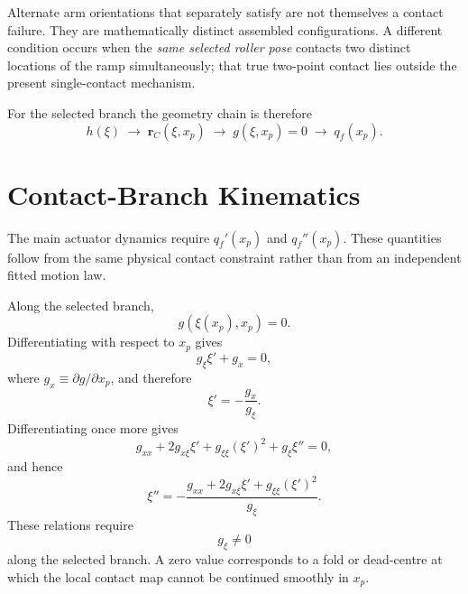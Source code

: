 \documentclass[11pt]{report}
\numberwithin{equation}{section}
\begin{document}
Alternate arm orientations that separately satisfy
 are not themselves a contact failure. They are
mathematically distinct assembled configurations. A different condition occurs
when the \emph{same selected roller pose} contacts two distinct locations of
the ramp simultaneously; that true two-point contact lies outside the present
single-contact mechanism.

For the selected branch the geometry chain is therefore
\begin{equation}
    \boxed{
    h(\xi)
    \;\longrightarrow\;
    \bm r_C(\xi,x_p)
    \;\longrightarrow\;
    g(\xi,x_p)=0
    \;\longrightarrow\;
    q_f(x_p).
    }
    \label{eq:appB_geometry_chain}
\end{equation}

\section{Contact-Branch Kinematics}
\label{app:flyweight_q_derivatives}

The main actuator dynamics require \(q_f'(x_p)\) and \(q_f''(x_p)\). These
quantities follow from the same physical contact constraint rather than from an
independent fitted motion law.

Along the selected branch,
\begin{equation}
    g(\xi(x_p),x_p)=0.
\end{equation}
Differentiating with respect to \(x_p\) gives
\begin{equation}
    g_\xi\xi'+g_x=0,
\end{equation}
where \(g_x\equiv\partial g/\partial x_p\), and therefore
\begin{equation}
    \boxed{
    \xi'
    =
    -\frac{g_x}{g_\xi}.
    }
    \label{eq:appB_xi_prime}
\end{equation}
Differentiating once more gives
\begin{equation}
    g_{xx}
    +2g_{x\xi}\xi'
    +g_{\xi\xi}(\xi')^2
    +g_\xi\xi''
    =0,
\end{equation}
and hence
\begin{equation}
    \boxed{
    \xi''
    =
    -
    \frac{
        g_{xx}
        +2g_{x\xi}\xi'
        +g_{\xi\xi}(\xi')^2
    }{
        g_\xi
    }.
    }
    \label{eq:appB_xi_double_prime}
\end{equation}
These relations require
\begin{equation}
    \boxed{g_\xi\neq0}
    \label{eq:appB_branch_regular}
\end{equation}
along the selected branch. A zero value corresponds to a fold or dead-centre at
which the local contact map cannot be continued smoothly in \(x_p\).
\end{document}
